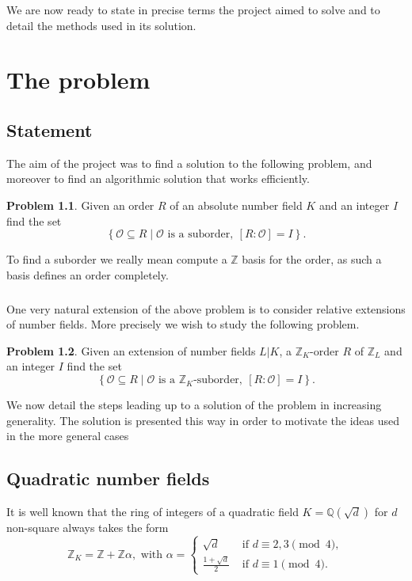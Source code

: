 \documentclass[11pt,a4paper]{report}
\theoremstyle{definition}
\newtheorem{prob}{Problem}
\begin{document}
We are now ready to state in precise terms the project aimed to solve and to detail the methods used in its solution.

\chapter{The problem}
\section{Statement}

The aim of the project was to find a solution to the following problem, and moreover to find an algorithmic solution that works efficiently.

\begin{prob}
Given an order $R$ of an absolute number field $K$ and an integer $I$ find the set
\[\left\{ \mathcal{O}\subseteq R \mid \mathcal{O}\text{ is a suborder},\ [R:\mathcal{O}] = I\right\}.\]
\end{prob}

To find a suborder we really mean compute a $\mathbb{Z}$ basis for the order, as such a basis defines an order completely.

\paragraph{}
One very natural extension of the above problem is to consider relative extensions of number fields.
More precisely we wish to study the following problem.

\begin{prob} %
Given an extension of number fields $L|K$, a $\mathbb{Z}_K$-order $R$ of $\mathbb{Z}_L$ and an integer $I$ find the set
\[\left\{ \mathcal{O}\subseteq R \mid \mathcal{O}\text{ is a $\mathbb{Z}_K$-suborder},\ [R:\mathcal{O}] = I\right\}.\]
\end{prob}

We now detail the steps leading up to a solution of the problem in increasing generality.
The solution is presented this way in order to motivate the ideas used in the more general cases

\section{Quadratic number fields}

It is well known \cite{} that the ring of integers of a quadratic field $K = \mathbb{Q}(\sqrt{d})$ for $d$ non-square always takes the form
\[\mathbb{Z}_K = \mathbb{Z} + \mathbb{Z}\alpha,\text{ with } \alpha =\begin{cases}
\sqrt{d}&\text{ if $d\equiv 2,3\pmod{4}$},\\
\frac{1+\sqrt{d}}{2}&\text{ if $d\equiv 1\pmod{4}$}.
\end{cases}\]
\end{document}
